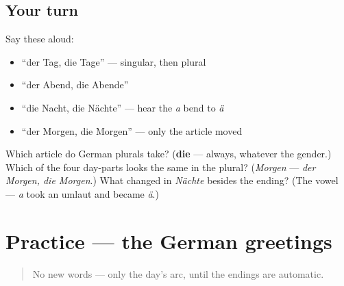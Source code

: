 \subsection*{Your turn}
Say these aloud:

\begin{itemize}
\raggedright
  \item \textquotedblleft{}der Tag, die Tage\textquotedblright{} — singular, then plural
  \item \textquotedblleft{}der Abend, die Abende\textquotedblright{}
  \item \textquotedblleft{}die Nacht, die Nächte\textquotedblright{} — hear the \emph{a} bend to \emph{ä}
  \item \textquotedblleft{}der Morgen, die Morgen\textquotedblright{} — only the article moved
\end{itemize}

\begin{tcolorbox}[breakable,colback=teal!4,colframe=teal!35!black,title={Before you move on}]
Which article do German plurals take? (\textbf{die} — always, whatever the gender.) Which of the four day-parts looks the same in the plural? (\emph{Morgen} — \emph{der Morgen, die Morgen}.) What changed in \emph{Nächte} besides the ending? (The vowel — \emph{a} took an umlaut and became \emph{ä}.)
\end{tcolorbox}
\section[Practice]{Practice — the German greetings}

\label{lesson:GE-C01-practice}



\begin{quote}
No new words — only the day's arc, until the endings are automatic.
\end{quote}

